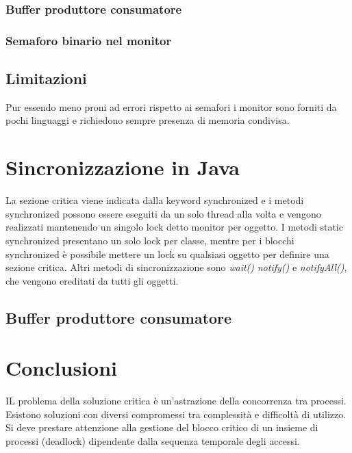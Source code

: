 \subsubsection{Buffer produttore consumatore}
\begin{multicols}{2}
	
	\columnbreak
	
\end{multicols}

\subsubsection{Semaforo binario nel monitor}

\subsection{Limitazioni}
Pur essendo meno proni ad errori rispetto ai semafori i monitor sono forniti da pochi linguaggi e richiedono sempre presenza di memoria condivisa. 
\section{Sincronizzazione in Java}
La sezione critica viene indicata dalla keyword synchronized e i metodi synchronized possono essere eseguiti da un solo thread alla volta e vengono realizzati mantenendo un singolo lock
detto monitor per oggetto. I metodi static synchronized presentano un solo lock per classe, mentre per i blocchi synchronized \`e possibile mettere un lock su qualsiasi oggetto per 
definire una sezione critica. Altri metodi di sincronizzazione sono \emph{wait()} \emph{notify()} e \emph{notifyAll()}, che vengono ereditati da tutti gli oggetti. 
\subsection{Buffer produttore consumatore}
\begin{multicols}{2}
	
	\columnbreak
	
	
\end{multicols}
\section{Conclusioni}
IL problema della soluzione critica \`e un'astrazione della concorrenza tra processi. Esistono soluzioni con diversi compromessi tra complessit\`a e difficolt\`a di utilizzo. Si 
deve prestare attenzione alla gestione del blocco critico di un insieme di processi (deadlock) dipendente dalla sequenza temporale degli accessi.
